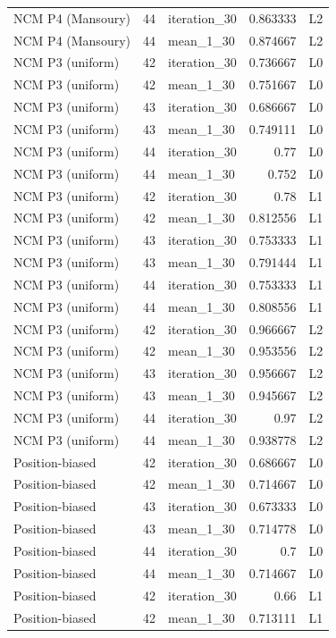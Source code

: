 \begin{table}[htbp!]
\begin{tabular}{lrlrl}
NCM P4 (Mansoury) & 44 & iteration\_30 & 0.863333 & L2 \\
NCM P4 (Mansoury) & 44 & mean\_1\_30 & 0.874667 & L2 \\
NCM P3 (uniform) & 42 & iteration\_30 & 0.736667 & L0 \\
NCM P3 (uniform) & 42 & mean\_1\_30 & 0.751667 & L0 \\
NCM P3 (uniform) & 43 & iteration\_30 & 0.686667 & L0 \\
NCM P3 (uniform) & 43 & mean\_1\_30 & 0.749111 & L0 \\
NCM P3 (uniform) & 44 & iteration\_30 & 0.77 & L0 \\
NCM P3 (uniform) & 44 & mean\_1\_30 & 0.752 & L0 \\
NCM P3 (uniform) & 42 & iteration\_30 & 0.78 & L1 \\
NCM P3 (uniform) & 42 & mean\_1\_30 & 0.812556 & L1 \\
NCM P3 (uniform) & 43 & iteration\_30 & 0.753333 & L1 \\
NCM P3 (uniform) & 43 & mean\_1\_30 & 0.791444 & L1 \\
NCM P3 (uniform) & 44 & iteration\_30 & 0.753333 & L1 \\
NCM P3 (uniform) & 44 & mean\_1\_30 & 0.808556 & L1 \\
NCM P3 (uniform) & 42 & iteration\_30 & 0.966667 & L2 \\
NCM P3 (uniform) & 42 & mean\_1\_30 & 0.953556 & L2 \\
NCM P3 (uniform) & 43 & iteration\_30 & 0.956667 & L2 \\
NCM P3 (uniform) & 43 & mean\_1\_30 & 0.945667 & L2 \\
NCM P3 (uniform) & 44 & iteration\_30 & 0.97 & L2 \\
NCM P3 (uniform) & 44 & mean\_1\_30 & 0.938778 & L2 \\
Position-biased & 42 & iteration\_30 & 0.686667 & L0 \\
Position-biased & 42 & mean\_1\_30 & 0.714667 & L0 \\
Position-biased & 43 & iteration\_30 & 0.673333 & L0 \\
Position-biased & 43 & mean\_1\_30 & 0.714778 & L0 \\
Position-biased & 44 & iteration\_30 & 0.7 & L0 \\
Position-biased & 44 & mean\_1\_30 & 0.714667 & L0 \\
Position-biased & 42 & iteration\_30 & 0.66 & L1 \\
Position-biased & 42 & mean\_1\_30 & 0.713111 & L1 \\

\end{tabular}
\end{table}
